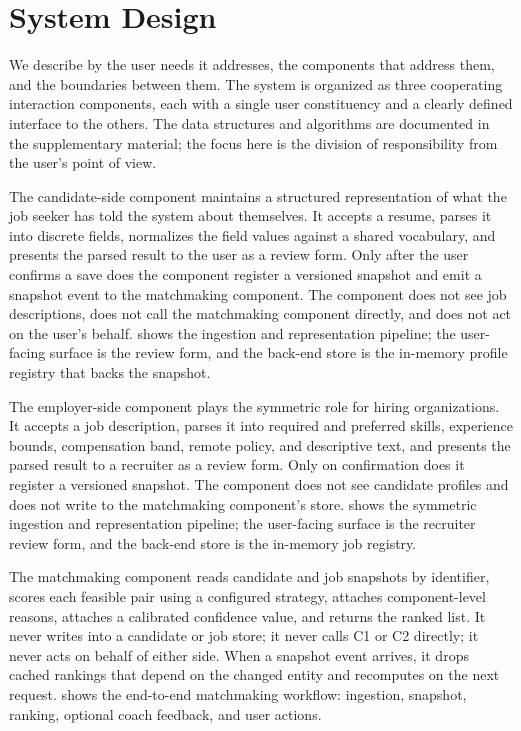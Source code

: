 \section{System Design}\label{sec:4}

We describe \JobMatch by the user needs it addresses, the components that address them, and the boundaries between them.
The system is organized as three cooperating interaction components, each with a single user constituency and a clearly defined interface to the others.
The data structures and algorithms are documented in the supplementary material; the focus here is the division of responsibility from the user's point of view.

The candidate-side component maintains a structured representation of what the job seeker has told the system about themselves.
It accepts a resume, parses it into discrete fields, normalizes the field values against a shared vocabulary, and presents the parsed result to the user as a review form.
Only after the user confirms a save does the component register a versioned snapshot and emit a snapshot event to the matchmaking component.
The component does not see job descriptions, does not call the matchmaking component directly, and does not act on the user's behalf.
 shows the ingestion and representation pipeline; the user-facing surface is the review form, and the back-end store is the in-memory profile registry that backs the snapshot.

The employer-side component plays the symmetric role for hiring organizations.
It accepts a job description, parses it into required and preferred skills, experience bounds, compensation band, remote policy, and descriptive text, and presents the parsed result to a recruiter as a review form.
Only on confirmation does it register a versioned snapshot.
The component does not see candidate profiles and does not write to the matchmaking component's store.
 shows the symmetric ingestion and representation pipeline; the user-facing surface is the recruiter review form, and the back-end store is the in-memory job registry.

The matchmaking component reads candidate and job snapshots by identifier, scores each feasible pair using a configured strategy, attaches component-level reasons, attaches a calibrated confidence value, and returns the ranked list.
It never writes into a candidate or job store; it never calls C1 or C2 directly; it never acts on behalf of either side.
When a snapshot event arrives, it drops cached rankings that depend on the changed entity and recomputes on the next request.
 shows the end-to-end matchmaking workflow: ingestion, snapshot, ranking, optional coach feedback, and user actions.

